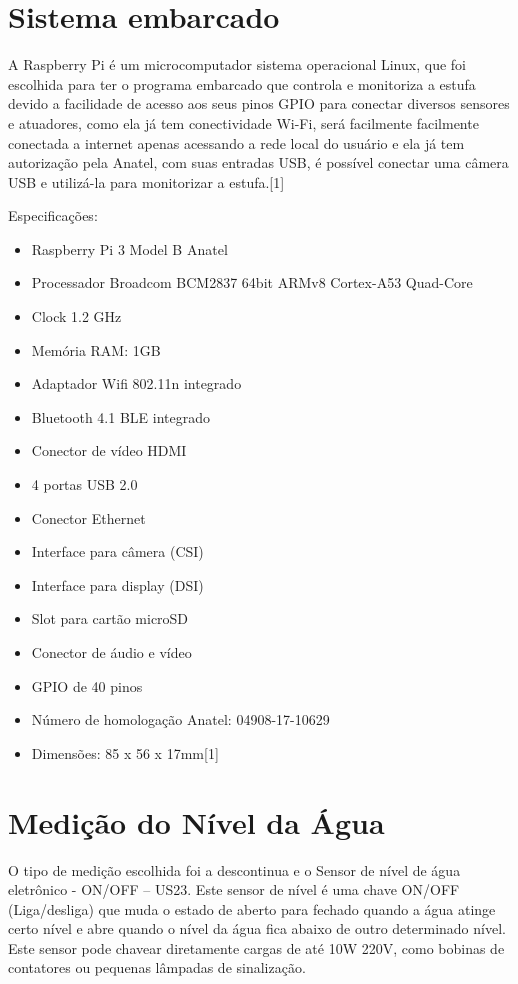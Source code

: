 \section{Sistema embarcado}
A Raspberry Pi é um microcomputador sistema operacional Linux, que foi escolhida para ter o programa embarcado que controla e monitoriza a estufa devido a facilidade de acesso aos seus pinos GPIO para conectar diversos sensores e atuadores, como ela já tem conectividade Wi-Fi, será facilmente facilmente conectada a internet apenas acessando a rede local do usuário e ela já tem autorização pela Anatel, com suas entradas USB, é possível conectar uma câmera USB e utilizá-la para monitorizar a estufa.[1]

Especificações:

\begin{itemize}
	\item Raspberry Pi 3 Model B Anatel
	\item Processador Broadcom BCM2837 64bit ARMv8 Cortex-A53 Quad-Core
	\item Clock 1.2 GHz
	\item Memória RAM: 1GB
	\item Adaptador Wifi 802.11n integrado
	\item Bluetooth 4.1 BLE integrado
	\item Conector de vídeo HDMI
	\item 4 portas USB 2.0
	\item Conector Ethernet
	\item Interface para câmera (CSI)
	\item Interface para display (DSI)
	\item Slot para cartão microSD
	\item Conector de áudio e vídeo
	\item GPIO de 40 pinos
	\item Número de homologação Anatel: 04908-17-10629 
	\item Dimensões: 85 x 56 x 17mm[1]
\end{itemize}

\section{Medição do Nível da Água}

O tipo de medição escolhida foi a descontinua e o Sensor de nível de água eletrônico - ON/OFF – US23. Este sensor de nível é uma chave ON/OFF (Liga/desliga) que muda o estado de aberto para fechado quando a água atinge certo nível e abre quando o nível da água fica abaixo de outro determinado nível. Este sensor pode chavear diretamente cargas de até 10W 220V, como bobinas de contatores ou pequenas lâmpadas de sinalização.

